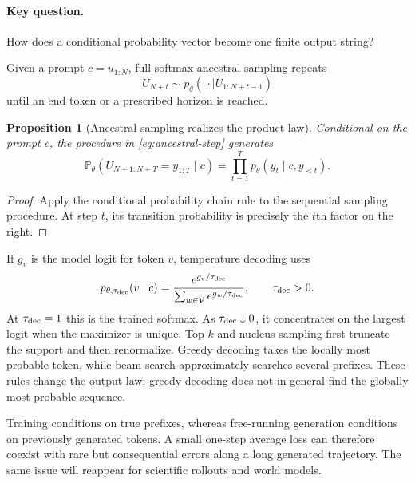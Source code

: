 \documentclass[11pt]{amsart}
\numberwithin{equation}{section}
\theoremstyle{definition}
\theoremstyle{plain}
\newtheorem{proposition}[definition]{Proposition}
\theoremstyle{remark}
\newcommand{\Prob}{\mathbb{P}}
\begin{document}
\paragraph{\textbf{Key question.}}
How does a conditional probability vector become one finite output string?

Given a prompt $c=u_{1:N}$, full-softmax ancestral sampling repeats
\begin{equation}\label{eq:ancestral-step}
 U_{N+t}\sim p_\theta(\,\cdot\mid U_{1:N+t-1})
\end{equation}
until an end token or a prescribed horizon is reached.

\begin{proposition}[Ancestral sampling realizes the product law]
\label{prop:ancestral-law}
Conditional on the prompt $c$, the procedure in
\eqref{eq:ancestral-step} generates
\begin{equation}\label{eq:conditional-product-law}
 \Prob_\theta(U_{N+1:N+T}=y_{1:T}\mid c)
 =\prod_{t=1}^T
   p_\theta(y_t\mid c,y_{<t}).
\end{equation}
\end{proposition}

\begin{proof}
Apply the conditional probability chain rule to the sequential sampling
procedure.  At step $t$, its transition probability is precisely the $t$th
factor on the right.
\end{proof}

If $g_v$ is the model logit for token $v$, temperature decoding uses
\begin{equation}\label{eq:temperature-law}
 p_{\theta,\tau_{\rm dec}}(v\mid c)
 =\frac{e^{g_v/\tau_{\rm dec}}}
        {\sum_{w\in\mathcal V}e^{g_w/\tau_{\rm dec}}},
 \qquad \tau_{\rm dec}>0.
\end{equation}
At $\tau_{\rm dec}=1$ this is the trained softmax.  As
$\tau_{\rm dec}\downarrow0$, it concentrates on the largest logit when the
maximizer is unique.  Top-$k$ and nucleus sampling first truncate the support
and then renormalize.  Greedy decoding takes the locally most probable token,
while beam search approximately searches several prefixes.  These rules change
the output law; greedy decoding does not in general find the globally most
probable sequence.

Training conditions on true prefixes, whereas free-running generation
conditions on previously generated tokens.  A small one-step average loss can
therefore coexist with rare but consequential errors along a long generated
trajectory.  The same issue will reappear for scientific rollouts and world
models.
\end{document}
